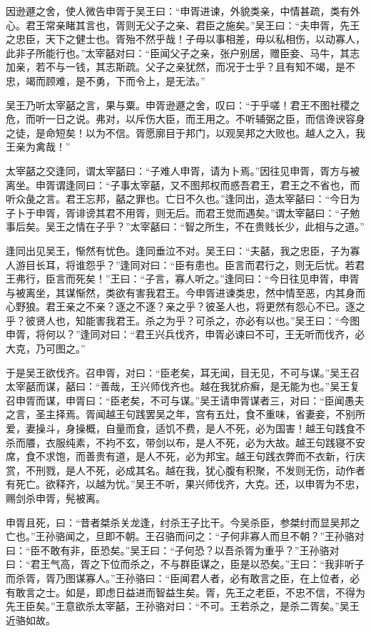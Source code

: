 \documentclass[12pt,UTF8]{ctexbook}
\begin{document}
因逊遯之舍，使人微告申胥于吴王曰：“申胥进谏，外貌类亲，中情甚疏，类有外心。君王常亲睹其言也，胥则无父子之亲、君臣之施矣。”吴王曰：“夫申胥，先王之忠臣，天下之健士也。胥殆不然乎哉！子毋以事相差，毋以私相伤，以动寡人，此非子所能行也。”太宰嚭对曰：“臣闻父子之亲，张户别居，赠臣妾、马牛，其志加亲，若不与一钱，其志斯疏。父子之亲犹然，而况于士乎？且有知不竭，是不忠，竭而顾难，是不勇，下而令上，是无法。”

吴王乃听太宰嚭之言，果与粟。申胥逊遯之舍，叹曰：“于乎嗟！君王不图社稷之危，而听一日之说。弗对，以斥伤大臣，而王用之。不听辅弼之臣，而信谗谀容身之徒，是命短矣！以为不信。胥愿廓目于邦门，以观吴邦之大败也。越人之入，我王亲为禽哉！”

太宰嚭之交逢同，谓太宰嚭曰：“子难人申胥，请为卜焉。”因往见申胥，胥方与被离坐。申胥谓逢同曰：“子事太宰嚭，又不图邦权而惑吾君王，君王之不省也，而听众彘之言。君王忘邦，嚭之罪也。亡日不久也。”逢同出，造太宰嚭曰：“今日为子卜于申胥，胥诽谤其君不用胥，则无后。而君王觉而遇矣。”谓太宰嚭曰：“子勉事后矣。吴王之情在子乎？”太宰嚭曰：“智之所生，不在贵贱长少，此相与之道。”

逢同出见吴王，惭然有忧色。逢同垂泣不对。吴王曰：“夫嚭，我之忠臣，子为寡人游目长耳，将谁怨乎？”逢同对曰：“臣有患也。臣言而君行之，则无后忧。若君王弗行，臣言而死矣！”王曰：“子言，寡人听之。”逢同曰：“今日往见申胥，申胥与被离坐，其谋惭然，类欲有害我君王。今申胥进谏类忠，然中情至恶，内其身而心野狼。君王亲之不亲？逐之不逐？亲之乎？彼圣人也，将更然有怨心不已。逐之乎？彼贤人也，知能害我君王。杀之为乎？可杀之，亦必有以也。”吴王曰：“今图申胥，将何以？”逢同对曰：“君王兴兵伐齐，申胥必谏曰不可，王无听而伐齐，必大克，乃可图之。”

于是吴王欲伐齐。召申胥，对曰：“臣老矣，耳无闻，目无见，不可与谋。”吴王召太宰嚭而谋，嚭曰：“善哉，王兴师伐齐也。越在我犹疥癣，是无能为也。”吴王复召申胥而谋，申胥曰：“臣老矣，不可与谋。”吴王请申胥谋者三，对曰：“臣闻愚夫之言，圣主择焉。胥闻越王句践罢吴之年，宫有五灶，食不重味，省妻妾，不别所爱，妻操斗，身操概，自量而食，适饥不费，是人不死，必为国害！越王句践食不杀而餍，衣服纯素，不袀不玄，带剑以布，是人不死，必为大故。越王句践寝不安席，食不求饱，而善贵有道，是人不死，必为邦宝。越王句践衣弊而不衣新，行庆赏，不刑戮，是人不死，必成其名。越在我，犹心腹有积聚，不发则无伤，动作者有死亡。欲释齐，以越为忧。”吴王不听，果兴师伐齐，大克。还，以申胥为不忠，赐剑杀申胥，髡被离。

申胥且死，曰：“昔者桀杀关龙逢，纣杀王子比干。今吴杀臣，参桀纣而显吴邦之亡也。”王孙骆闻之，旦即不朝。王召骆而问之：“子何非寡人而旦不朝？”王孙骆对曰：“臣不敢有非，臣恐矣。”吴王曰：“子何恐？以吾杀胥为重乎？”王孙骆对曰：“君王气高，胥之下位而杀之，不与群臣谋之，臣是以恐矣。”王曰：“我非听子而杀胥，胥乃图谋寡人。”王孙骆曰：“臣闻君人者，必有敢言之臣，在上位者，必有敢言之士。如是，即虑日益进而智益生矣。胥，先王之老臣，不忠不信，不得为先王臣矣。”王意欲杀太宰嚭，王孙骆对曰：“不可。王若杀之，是杀二胥矣。”吴王近骆如故。
\end{document}
